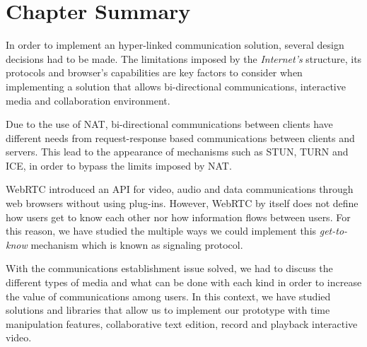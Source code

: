 \section{Chapter Summary}
\label{related:summary}

In order to implement an hyper-linked communication solution, several design decisions had to be made. The limitations imposed by the \emph{Internet's} structure, its protocols and browser's capabilities are key factors to consider when implementing a solution that allows bi-directional communications, interactive media and collaboration environment.

Due to the use of \ac{NAT}, bi-directional communications between clients have different needs from request-response based communications between clients and servers.
This lead to the appearance of mechanisms such as \ac{STUN}, \ac{TURN} and \ac{ICE}, in order to bypass the limits imposed by \ac{NAT}.

\ac{WebRTC} introduced an \ac{API} for video, audio and data communications through web browsers without using plug-ins.
However, \ac{WebRTC} by itself does not define how users get to know each other nor how information flows between users. For this reason, we have studied the multiple ways we could implement this \emph{get-to-know} mechanism which is known as signaling protocol.

With the communications establishment issue solved, we had to discuss the different types of media and what can be done with each kind in order to increase the value of communications among users. In this context, we have studied solutions and libraries that allow us to implement our prototype with time manipulation features, collaborative text edition, record and playback interactive video. 
